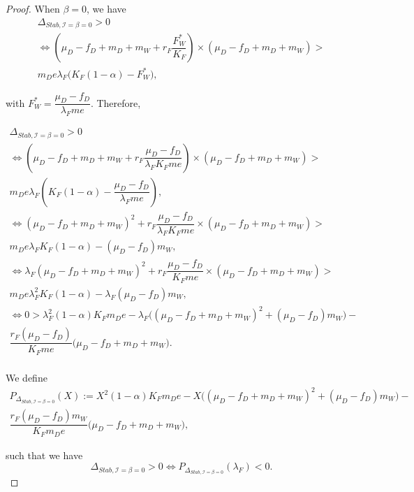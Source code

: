 \documentclass{article}
\newcommand{\lfw}{\lambda_{F}}
\newcommand{\lfw}{\lambda_{F}}
\newcommand{\cI}{\mathcal{I}}
\begin{document}
\begin{proof}
When $\beta = 0$, we have
\begin{multline} \label{DeltaStab, generalCase}
\Delta_{Stab, \cI =\beta = 0} > 0 \\ 
\Leftrightarrow \left(\mu_D - f_D + m_D + m_W + r_F\dfrac{F_W^*}{K_F} \right) \times   \left( \mu_D -f_D + m_D + m_W \right) > \\ m_D e \lfw \Big(K_F(1-\alpha) - F_W^* \Big),
\end{multline}

with $F_W^* = \dfrac{\mu_D - f_D}{\lfw m e}$. Therefore,

\begin{multline*}
\Delta_{Stab, \cI=\beta = 0} > 0 \\
\Leftrightarrow \left(\mu_D - f_D + m_D + m_W + r_F \dfrac{\mu_D - f_D}{\lfw K_F m e} \right) \times   \left( \mu_D -f_D + m_D + m_W \right) > \\ m_D e \lfw \left(K_F(1-\alpha) - \dfrac{\mu_D - f_D}{\lfw m e} \right), \\
\Leftrightarrow (\mu_D - f_D + m_D + m_W)^2 + r_F \dfrac{\mu_D - f_D}{\lfw K_F m e}  \times   \left( \mu_D -f_D + m_D + m_W \right) > \\ m_D e \lfw K_F(1-\alpha) - (\mu_D - f_D)m_W , \\
\Leftrightarrow \lfw (\mu_D - f_D + m_D + m_W)^2 + r_F \dfrac{\mu_D - f_D}{K_F m e}  \times   \left( \mu_D -f_D + m_D + m_W \right) > \\ m_D e \lfw^2 K_F(1-\alpha) - \lfw (\mu_D - f_D)m_W , \\
\Leftrightarrow 0 > \lfw^2 (1-\alpha) K_F  m_D e - \lfw \Big((\mu_D - f_D + m_D + m_W)^2 +(\mu_D - f_D)m_W \Big) - \\ \dfrac{r_F (\mu_D - f_D) }{K_F m e}  \big( \mu_D -f_D + m_D + m_W \big).\\
\end{multline*}

We define 
\begin{multline*}
P_{\Delta_{Stab, \cI= \beta = 0}}(X) := X^2 (1-\alpha) K_F  m_D e - X \Big((\mu_D - f_D + m_D + m_W)^2 +(\mu_D - f_D)m_W \Big) - \\ \dfrac{r_F (\mu_D - f_D) m_W}{K_F m_D e}  \big( \mu_D -f_D + m_D + m_W \big),
\end{multline*} 

such that we have 
\begin{equation}
\Delta_{Stab, \cI= \beta = 0} > 0 \Leftrightarrow P_{\Delta_{Stab, \cI= \beta = 0}}(\lfw) < 0.
\label{equivalenceDeltaStabP}
\end{equation}


\end{proof}
\end{document}
